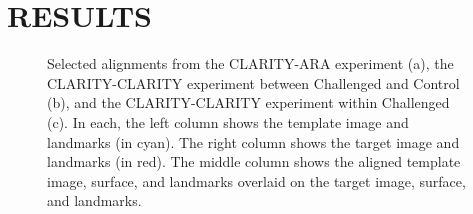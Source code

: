 \documentclass[]{spie}  %
\begin{document}
\section{RESULTS}

\begin{figure}[ht]
 \centering
 \vspace{1cm}
 \caption{ Selected alignments from the CLARITY-ARA experiment (a), the CLARITY-CLARITY experiment between Challenged and Control (b), and the CLARITY-CLARITY experiment within Challenged (c).
   In each, the left column shows the template image and landmarks (in cyan). The right column shows the target image and landmarks (in red).
   The middle column shows the aligned template image, surface, and landmarks overlaid on the target image, surface, and landmarks. }
 \label{fig:expriments}
\end{figure}
\end{document}
